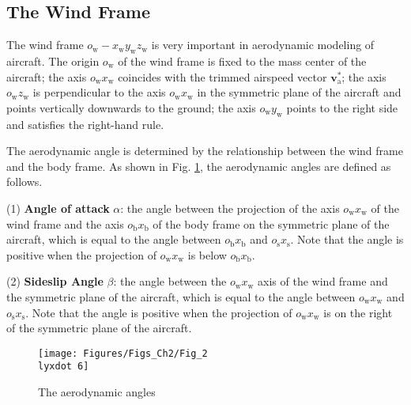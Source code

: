 \subsection{The Wind Frame}

The wind frame ${{o}_{\text{w}}}-{{x}_{\text{w}}}{{y}_{\text{w}}}{{z}_{\text{w}}}$
is very important in aerodynamic modeling of aircraft. The origin
${{o}_{\text{w}}}$ of the wind frame is fixed to the mass center
of the aircraft; the axis ${{o}_{\text{w}}}{{x}_{\text{w}}}$ coincides
with the trimmed airspeed vector $\mathbf{v}_{\text{a}}^{*}$; the
axis ${{o}_{\text{w}}}{{z}_{\text{w}}}$ is perpendicular to the axis
${{o}_{\text{w}}}{{x}_{\text{w}}}$ in the symmetric plane of the
aircraft and points vertically downwards to the ground; the axis ${{o}_{\text{w}}}{{y}_{\text{w}}}$
points to the right side and satisfies the right-hand rule.

The aerodynamic angle is determined by the relationship between the
wind frame and the body frame. As shown in Fig. \ref{Fig_2.6}, the
aerodynamic angles are defined as follows.

(1) \textbf{Angle of attack} $\alpha$: the angle between the projection
of the axis ${{o}_{\text{w}}}{{x}_{\text{w}}}$ of the wind frame
and the axis ${{o}_{\text{b}}}{{x}_{\text{b}}}$ of the body frame
on the symmetric plane of the aircraft, which is equal to the angle
between ${{o}_{\text{b}}}{{x}_{\text{b}}}$ and ${{o}_{\text{s}}}{{x}_{\text{s}}}$.
Note that the angle is positive when the projection of ${{o}_{\text{w}}}{{x}_{\text{w}}}$
is below ${{o}_{\text{b}}}{{x}_{\text{b}}}$.

(2) \textbf{Sideslip Angle} $\beta$: the angle between the ${{o}_{\text{w}}}{{x}_{\text{w}}}$
axis of the wind frame and the symmetric plane of the aircraft, which
is equal to the angle between ${{o}_{\text{w}}}{{x}_{\text{w}}}$
and ${{o}_{\text{s}}}{{x}_{\text{s}}}$. Note that the angle is positive
when the projection of ${{o}_{\text{w}}}{{x}_{\text{w}}}$ is on the
right of the symmetric plane of the aircraft.

\begin{figure}
	\begin{centering}
		\texttt{[image: Figures/Figs\_Ch2/Fig\_2\\lyxdot 6]}
		\par\end{centering}
	\caption{The aerodynamic angles}
	
	\centering{}\label{Fig_2.6}
\end{figure}

